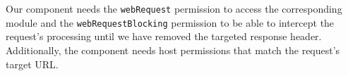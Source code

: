 	Our component needs the \texttt{webRequest} permission to access the corresponding module and the \texttt{webRequestBlocking} permission to be able to intercept the request's processing until we have removed the targeted response header. Additionally, the component needs host permissions that match the request's target URL. 